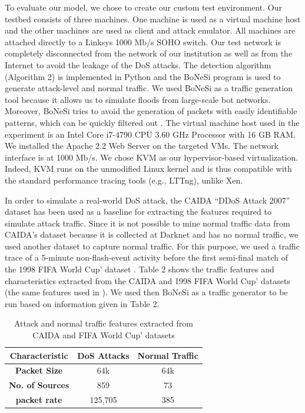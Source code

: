 \documentclass[twocolumn]{bmcart}%
\begin{document}
To evaluate our model, we chose to create our custom test environment. Our testbed consists of three machines. One machine is used as a virtual machine host and the other machines are used as client and attack emulator. All machines are attached directly to a Linksys 1000 Mb/s SOHO switch. Our test network is completely disconnected from the network of our institution as well as from the Internet to avoid the leakage of the DoS attacks. The detection algorithm (Algorithm 2) is implemented in Python and the BoNeSi program is used \cite{Markus:2015} to generate attack-level and normal traffic. We used BoNeSi as a traffic generation tool because it allows us to simulate floods from large-scale bot networks. Moreover, BoNeSi tries to avoid the generation of packets with easily identifiable patterns, which can be quickly filtered out \cite{Markus:2015}. The virtual machine host used in the experiment is an Intel Core i7-4790 CPU 3.60 GHz Processor with 16 GB RAM. We installed the Apache 2.2 Web Server on the targeted VMs. The network interface is at 1000 Mb/s. We chose KVM \cite{KVM:2016} as our hypervisor-based virtualization. Indeed, KVM runs on the unmodified Linux kernel and is thus compatible with the standard performance tracing tools (e.g., LTTng), unlike Xen.

In order to simulate a real-world DoS attack, the CAIDA “DDoS Attack 2007” dataset \cite{Hick:2007} has been used as a baseline for extracting the features required to simulate attack traffic.  Since it is not possible to mine normal traffic data from CAIDA's dataset because it
is collected at Darknet and has no normal traffic, we used another dataset to capture normal traffic. For this purpose, we used a traffic trace of a 5-minute non-flash-event activity before the first semi-final match of the 1998 FIFA World Cup’ dataset \cite{Arlitt:1998}. Table 2 shows the traffic features and characteristics extracted from the CAIDA and  1998 FIFA World Cup’ datasets (the same features used in \cite{bhatia2014framework}). We used then BoNeSi as a traffic generator to be run based on information given in Table 2.

\begin{table}[ht]\small
\caption{Attack and normal traffic features extracted from CAIDA and FIFA World Cup’ datasets }
\centering
 \begin{tabular}{c c c}
 \hline
 \textbf{Characteristic} & \textbf{DoS Attacks}  & \textbf{Normal Traffic}  \\
\hline
 \textbf{Packet Size} &  64k & 64k\\
 \textbf{No. of Sources} & 859 & 73 \\
 \textbf{packet rate}  &  125,705 & 385 \\
\end{tabular}
\end{table}
\end{document}

